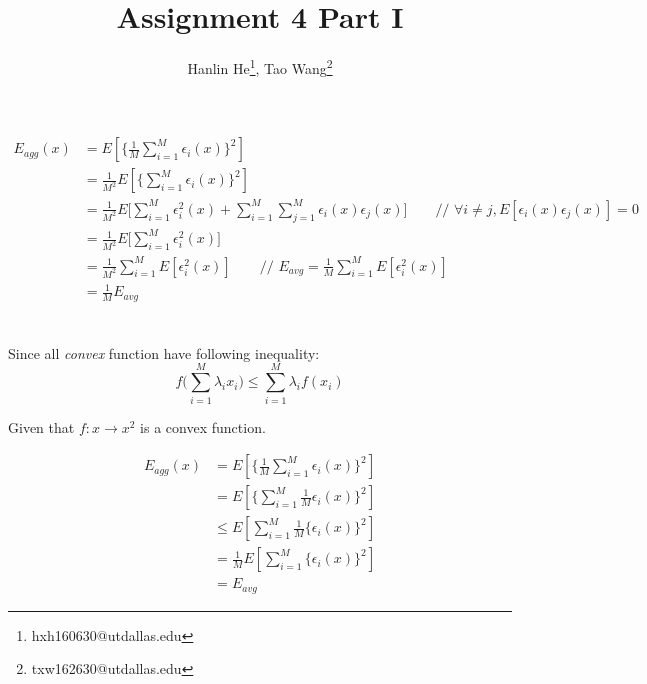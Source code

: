 \documentclass[12pt, letterpaper]{article}
\title{Assignment 4 Part I}
\author{Hanlin He\footnote{hxh160630@utdallas.edu},
Tao Wang\footnote{txw162630@utdallas.edu}}
\begin{document}
\maketitle

\section{}

\begin{align*}
E_{agg}(x) &= E\left[\bigg\{\frac{1}{M}\sum_{i=1}^M\epsilon_i(x)\bigg\}^2\right]\\
&= \frac{1}{M^2}E\left[\bigg\{\sum_{i=1}^M\epsilon_i(x)\bigg\}^2\right]\\
&= \frac{1}{M^2}E\bigg[\sum_{i=1}^M\epsilon_i^2(x)+\sum_{i=1}^M\sum_{j=1}^M\epsilon_i(x)\epsilon_j(x)\bigg]\qquad\text{// }\forall i\neq j,E[\epsilon_i(x)\epsilon_j(x)]=0\\
&= \frac{1}{M^2}E\bigg[\sum_{i=1}^M\epsilon_i^2(x)\bigg]\\
&= \frac{1}{M^2}\sum_{i=1}^ME[\epsilon_i^2(x)]\qquad\text{// }E_{avg}=\frac{1}{M}\sum_{i=1}^ME[\epsilon_i^2(x)]\\
&= \frac{1}{M}E_{avg}
\end{align*}

\section{}

Since all \emph{convex} function have following inequality:
\[f\bigg(\sum_{i=1}^M\lambda_ix_i\bigg)\leq\sum_{i=1}^M\lambda_if(x_i)\]

Given that $f: x \rightarrow x^2$ is a convex function.

\begin{align*}
E_{agg}(x) &= E\left[\bigg\{\frac{1}{M}\sum_{i=1}^M\epsilon_i(x)\bigg\}^2\right]\\
&= E\left[\bigg\{\sum_{i=1}^M\frac{1}{M}\epsilon_i(x)\bigg\}^2\right]\\
&\leq E\left[\sum_{i=1}^M\frac{1}{M}\bigg\{\epsilon_i(x)\bigg\}^2\right]\\
&= \frac{1}{M}E\left[\sum_{i=1}^M\bigg\{\epsilon_i(x)\bigg\}^2\right]\\
&= E_{avg}
\end{align*}
\end{document}
